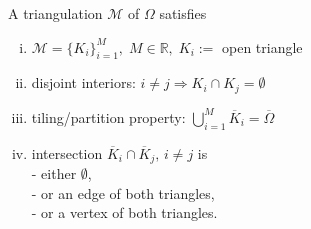 \begin{mdfdef}[Triangulation]
	A triangulation $\mathcal{M}$ of $\Omega$ satisfies 
	\begin{enumerate}[(i)]
		\item $\mathcal{M}=\{K_i\}_{i=1}^{M},\; M\in 
			\mathbb{R},\;K_i := $ open triangle
		\item disjoint interiors: $i\neq j \Rightarrow 
									K_i \cap K_j  = \emptyset$
		\item tiling/partition property: $ \displaystyle
			\bigcup_{i=1}^{M} \overline{K}_i=\overline{\Omega}$
		\item intersection $\overline{K}_i \cap \overline{K}_j,\,
			i\neq j$ is\\
				- either $\emptyset$,\\
				- or an edge of both triangles,\\
				- or a vertex of both triangles.
	\end{enumerate}
\end{mdfdef}